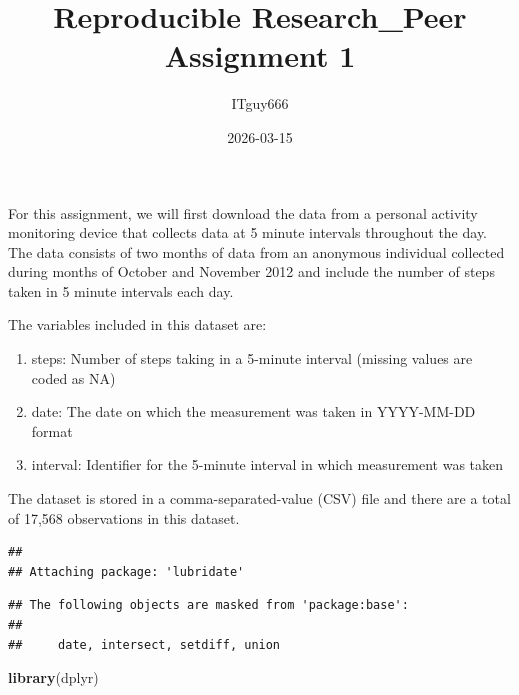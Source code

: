 \documentclass[
]{article}
\title{Reproducible Research\_Peer Assignment 1}
\author{ITguy666}
\date{2026-03-15}
\newenvironment{Shaded}{\begin{snugshade}}{\end{snugshade}}
\newcommand{\AttributeTok}[1]{\textcolor[rgb]{0.13,0.29,0.53}{#1}}
\newcommand{\ConstantTok}[1]{\textcolor[rgb]{0.56,0.35,0.01}{#1}}
\newcommand{\DocumentationTok}[1]{\textcolor[rgb]{0.56,0.35,0.01}{\textbf{\textit{#1}}}}
\newcommand{\FunctionTok}[1]{\textcolor[rgb]{0.13,0.29,0.53}{\textbf{#1}}}
\newcommand{\NormalTok}[1]{#1}
\newcommand{\SpecialCharTok}[1]{\textcolor[rgb]{0.81,0.36,0.00}{\textbf{#1}}}
\begin{document}
\maketitle

For this assignment, we will first download the data from a personal
activity monitoring device that collects data at 5 minute intervals
throughout the day. The data consists of two months of data from an
anonymous individual collected during months of October and November
2012 and include the number of steps taken in 5 minute intervals each
day.

The variables included in this dataset are:

\begin{enumerate}
\def\labelenumi{\arabic{enumi})}
\item
  steps: Number of steps taking in a 5-minute interval (missing values
  are coded as NA)
\item
  date: The date on which the measurement was taken in YYYY-MM-DD format
\item
  interval: Identifier for the 5-minute interval in which measurement
  was taken
\end{enumerate}

The dataset is stored in a comma-separated-value (CSV) file and there
are a total of 17,568 observations in this dataset.

\begin{Shaded}
\end{Shaded}

\begin{verbatim}
## 
## Attaching package: 'lubridate'
\end{verbatim}

\begin{verbatim}
## The following objects are masked from 'package:base':
## 
##     date, intersect, setdiff, union
\end{verbatim}

\begin{Shaded}
\begin{Highlighting}[]
\FunctionTok{library}\NormalTok{(dplyr)}
\end{Highlighting}
\end{Shaded}
\end{document}
